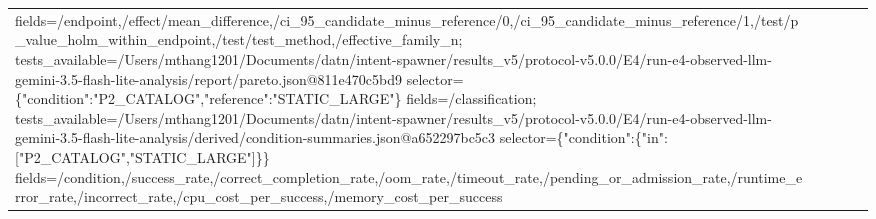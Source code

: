 \begin{tabular}{lllll}
fields=/endpoint,/effect/mean\_difference,/ci\_95\_candidate\_minus\_reference/0,/ci\_95\_candidate\_minus\_reference/1,/test/p\_value\_holm\_within\_endpoint,/test/test\_method,/effective\_family\_n; tests\_available=/Users/mthang1201/Documents/datn/intent-spawner/results\_v5/protocol-v5.0.0/E4/run-e4-observed-llm-gemini-3.5-flash-lite-analysis/report/pareto.json@811e470c5bd9 selector=\{"condition":"P2\_CATALOG","reference":"STATIC\_LARGE"\} fields=/classification; tests\_available=/Users/mthang1201/Documents/datn/intent-spawner/results\_v5/protocol-v5.0.0/E4/run-e4-observed-llm-gemini-3.5-flash-lite-analysis/derived/condition-summaries.json@a652297bc5c3 selector=\{"condition":\{"in":["P2\_CATALOG","STATIC\_LARGE"]\}\} fields=/condition,/success\_rate,/correct\_completion\_rate,/oom\_rate,/timeout\_rate,/pending\_or\_admission\_rate,/runtime\_error\_rate,/incorrect\_rate,/cpu\_cost\_per\_success,/memory\_cost\_per\_success \\

\end{tabular}
